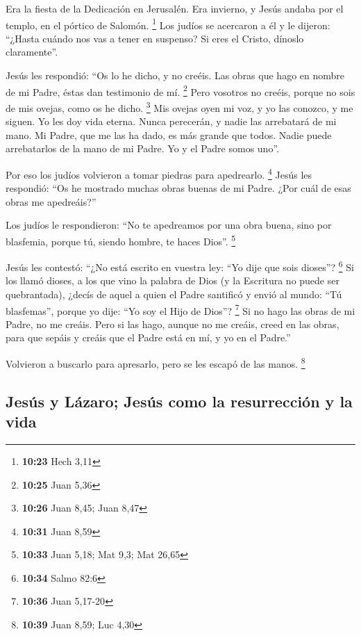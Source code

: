 Era la fiesta de la Dedicación en Jerusalén.
 Era invierno, y Jesús andaba por el templo, en el
pórtico de Salomón. \footnote{\textbf{10:23} Hech 3,11} 
Los judíos se acercaron a él y le dijeron: ``¿Hasta cuándo nos vas a
tener en suspenso? Si eres el Cristo, dínoslo claramente''.

 Jesús les respondió: ``Os lo he dicho, y no creéis. Las
obras que hago en nombre de mi Padre, éstas dan testimonio de mí.
\footnote{\textbf{10:25} Juan 5,36}  Pero vosotros no
creéis, porque no sois de mis ovejas, como os he dicho. \footnote{\textbf{10:26}
  Juan 8,45; Juan 8,47}  Mis ovejas oyen mi voz, y yo las
conozco, y me siguen.  Yo les doy vida eterna. Nunca
perecerán, y nadie las arrebatará de mi mano.  Mi Padre,
que me las ha dado, es más grande que todos. Nadie puede arrebatarlos de
la mano de mi Padre.  Yo y el Padre somos uno''.

 Por eso los judíos volvieron a tomar piedras para
apedrearlo. \footnote{\textbf{10:31} Juan 8,59}  Jesús
les respondió: ``Os he mostrado muchas obras buenas de mi Padre. ¿Por
cuál de esas obras me apedreáis?''

 Los judíos le respondieron: ``No te apedreamos por una
obra buena, sino por blasfemia, porque tú, siendo hombre, te haces
Dios''. \footnote{\textbf{10:33} Juan 5,18; Mat 9,3; Mat 26,65}

 Jesús les contestó: ``¿No está escrito en vuestra ley:
``Yo dije que sois dioses''? \footnote{\textbf{10:34} Salmo 82:6}
 Si los llamó dioses, a los que vino la palabra de Dios
(y la Escritura no puede ser quebrantada),  ¿decís de
aquel a quien el Padre santificó y envió al mundo: ``Tú blasfemas'',
porque yo dije: ``Yo soy el Hijo de Dios''? \footnote{\textbf{10:36}
  Juan 5,17-20}  Si no hago las obras de mi Padre, no me
creáis.  Pero si las hago, aunque no me creáis, creed en
las obras, para que sepáis y creáis que el Padre está en mí, y yo en el
Padre.''

 Volvieron a buscarlo para apresarlo, pero se les escapó
de las manos. \footnote{\textbf{10:39} Juan 8,59; Luc 4,30}

\hypertarget{jesuxfas-y-luxe1zaro-jesuxfas-como-la-resurrecciuxf3n-y-la-vida}{%
\subsection{Jesús y Lázaro; Jesús como la resurrección y la
vida}\label{jesuxfas-y-luxe1zaro-jesuxfas-como-la-resurrecciuxf3n-y-la-vida}}

